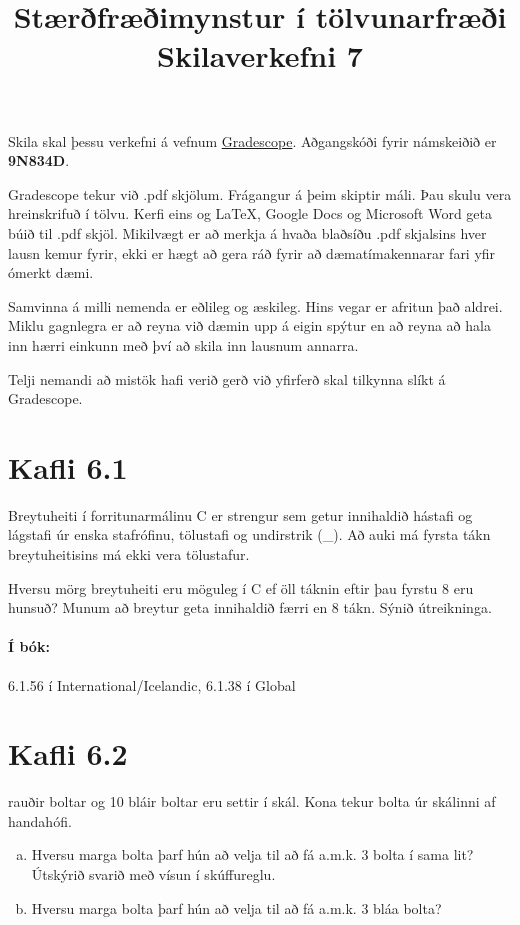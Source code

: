\documentclass{article}
\title{Stærðfræðimynstur í tölvunarfræði \\ Skilaverkefni 7}
\author{}
\begin{document}
\maketitle

Skila skal þessu verkefni á vefnum \href{https://gradescope.com/courses/9487}{Gradescope}. Aðgangskóði fyrir námskeiðið er \textbf{9N834D}. 

Gradescope tekur við .pdf skjölum. Frágangur á þeim skiptir máli. Þau skulu vera hreinskrifuð í tölvu. Kerfi eins og \LaTeX, Google Docs og Microsoft Word geta búið til .pdf skjöl. Mikilvægt er að merkja á hvaða blaðsíðu .pdf skjalsins hver lausn kemur fyrir, ekki er hægt að gera ráð fyrir að dæmatímakennarar fari yfir ómerkt dæmi.

Samvinna á milli nemenda er eðlileg og æskileg. Hins vegar er afritun það aldrei. Miklu gagnlegra er að reyna við dæmin upp á eigin spýtur en að reyna að hala inn hærri einkunn með því að skila inn lausnum annarra.

Telji nemandi að mistök hafi verið gerð við yfirferð skal tilkynna slíkt á Gradescope.

\section{Kafli 6.1}

\question Breytuheiti í forritunarmálinu C er strengur sem getur innihaldið hástafi og lágstafi úr enska stafrófinu, tölustafi og undirstrik (\_). Að auki má fyrsta tákn breytuheitisins má ekki vera tölustafur.

Hversu mörg breytuheiti eru möguleg í C ef öll táknin eftir þau fyrstu 8 eru hunsuð? Munum að breytur geta innihaldið færri en 8 tákn. Sýnið útreikninga.

\paragraph{Í bók:} 6.1.56 í International/Icelandic, 6.1.38 í Global

\section{Kafli 6.2}

 rauðir boltar og 10 bláir boltar eru settir í skál. Kona tekur bolta úr skálinni af handahófi.

\begin{enumerate}[a)]
    \item Hversu marga bolta þarf hún að velja til að fá a.m.k. 3 bolta í sama lit? Útskýrið svarið með vísun í skúffureglu.
    \item Hversu marga bolta þarf hún að velja til að fá a.m.k. 3 bláa bolta?
\end{enumerate}
\end{document}
